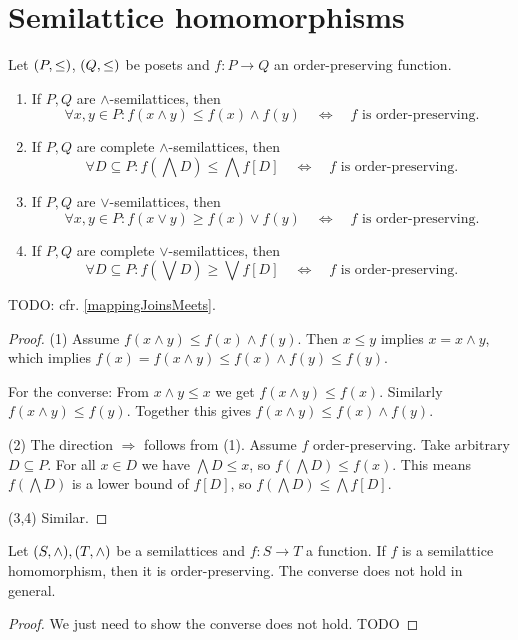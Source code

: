\section{Semilattice homomorphisms}
\begin{proposition} \label{orderPreservingFunctionLatticeOperations}
Let $\sSet{P,\leq}$, $\sSet{Q,\leq}$ be posets and $f: P\to Q$ an order-preserving function.
\begin{enumerate}
\item If $P,Q$ are $\wedge$-semilattices, then
\[  \forall x,y\in P: f(x\wedge y) \leq f(x)\wedge f(y) \quad\iff\quad \text{$f$ is order-preserving}. \]
\item If $P,Q$ are complete $\wedge$-semilattices, then
\[  \forall D\subseteq P: f(\bigwedge D) \leq \bigwedge f[D] \quad\iff\quad \text{$f$ is order-preserving}. \]
\item If $P,Q$ are $\vee$-semilattices, then
\[  \forall x,y\in P: f(x\vee y) \geq f(x)\vee f(y) \quad\iff\quad \text{$f$ is order-preserving}. \]
\item If $P,Q$ are complete $\vee$-semilattices, then
\[  \forall D\subseteq P: f(\bigvee D) \geq \bigvee f[D] \quad\iff\quad \text{$f$ is order-preserving}. \]
\end{enumerate} 
\end{proposition}
TODO: cfr. \ref{mappingJoinsMeets}.
\begin{proof}
(1) Assume $f(x\wedge y) \leq f(x)\wedge f(y)$. Then $x\leq y$ implies $x = x\wedge y$, which implies $f(x) = f(x\wedge y) \leq f(x)\wedge f(y) \leq f(y)$.

For the converse: From $x\wedge y \leq x$ we get $f(x\wedge y) \leq f(x)$. Similarly $f(x\wedge y) \leq f(y)$. Together this gives $f(x\wedge y) \leq f(x)\wedge f(y)$.

(2) The direction $\Rightarrow$ follows from (1). Assume $f$ order-preserving. Take arbitrary $D\subseteq P$. For all $x\in D$ we have $\bigwedge D \leq x$, so $f(\bigwedge D) \leq f(x)$. This means $f(\bigwedge D)$ is a lower bound of $f[D]$, so $f(\bigwedge D) \leq \bigwedge f[D]$.

(3,4) Similar.
\end{proof}
\begin{corollary}
Let $\sSet{S,\wedge}, \sSet{T, \wedge}$ be a semilattices and $f: S\to T$ a function. If $f$ is a semilattice homomorphism, then it is order-preserving. The converse does not hold in general.
\end{corollary}
\begin{proof}
We just need to show the converse does not hold. TODO
\end{proof}



